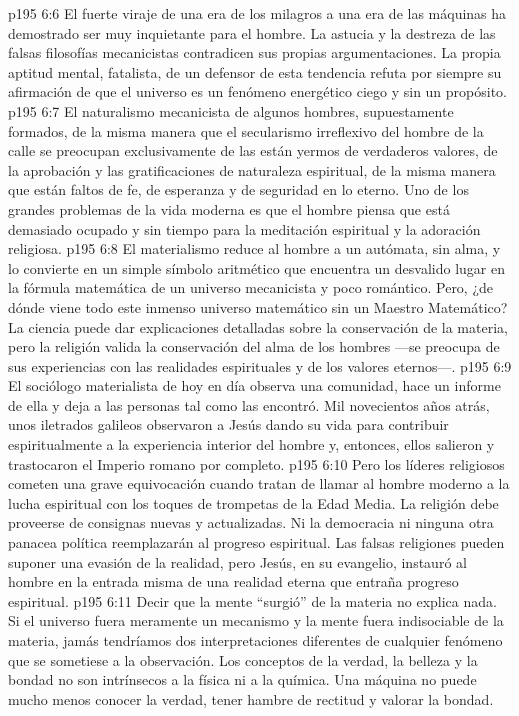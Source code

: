 \vs p195 6:6 El fuerte viraje de una era de los milagros a una era de las máquinas ha demostrado ser muy inquietante para el hombre. La astucia y la destreza de las falsas filosofías mecanicistas contradicen sus propias argumentaciones. La propia aptitud mental, fatalista, de un defensor de esta tendencia refuta por siempre su afirmación de que el universo es un fenómeno energético ciego y sin un propósito.
\vs p195 6:7 El naturalismo mecanicista de algunos hombres, supuestamente formados, de la misma manera que el secularismo irreflexivo del hombre de la calle se preocupan exclusivamente de las  están yermos de verdaderos valores, de la aprobación y las gratificaciones de naturaleza espiritual, de la misma manera que están faltos de fe, de esperanza y de seguridad en lo eterno. Uno de los grandes problemas de la vida moderna es que el hombre piensa que está demasiado ocupado y sin tiempo para la meditación espiritual y la adoración religiosa.
\vs p195 6:8 El materialismo reduce al hombre a un autómata, sin alma, y lo convierte en un simple símbolo aritmético que encuentra un desvalido lugar en la fórmula matemática de un universo mecanicista y poco romántico. Pero, ¿de dónde viene todo este inmenso universo matemático sin un Maestro Matemático? La ciencia puede dar explicaciones detalladas sobre la conservación de la materia, pero la religión valida la conservación del alma de los hombres ---se preocupa de sus experiencias con las realidades espirituales y de los valores eternos---.
\vs p195 6:9 El sociólogo materialista de hoy en día observa una comunidad, hace un informe de ella y deja a las personas tal como las encontró. Mil novecientos años atrás, unos iletrados galileos observaron a Jesús dando su vida para contribuir espiritualmente a la experiencia interior del hombre y, entonces, ellos salieron y trastocaron el Imperio romano por completo.
\vs p195 6:10 Pero los líderes religiosos cometen una grave equivocación cuando tratan de llamar al hombre moderno a la lucha espiritual con los toques de trompetas de la Edad Media. La religión debe proveerse de consignas nuevas y actualizadas. Ni la democracia ni ninguna otra panacea política reemplazarán al progreso espiritual. Las falsas religiones pueden suponer una evasión de la realidad, pero Jesús, en su evangelio, instauró al hombre en la entrada misma de una realidad eterna que entraña progreso espiritual.
\vs p195 6:11 Decir que la mente “surgió” de la materia no explica nada. Si el universo fuera meramente un mecanismo y la mente fuera indisociable de la materia, jamás tendríamos dos interpretaciones diferentes de cualquier fenómeno que se sometiese a la observación. Los conceptos de la verdad, la belleza y la bondad no son intrínsecos a la física ni a la química. Una máquina no puede  mucho menos conocer la verdad, tener hambre de rectitud y valorar la bondad.
